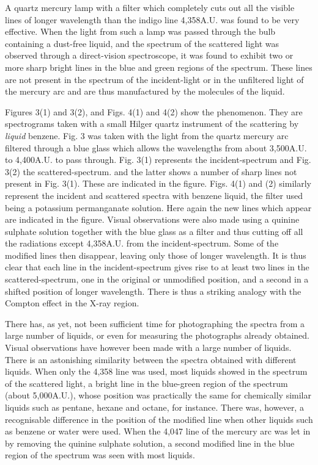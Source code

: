 A quartz mercury lamp with a filter which completely cuts out all the visible lines of longer wavelength than the indigo line \hbox{4,358A.U}. was found to be very effective. When the light from such a lamp was passed through the bulb containing a dust-free liquid, and the spectrum of the scattered light was observed through a direct-vision spectroscope, it was found to exhibit two or more sharp bright lines in the blue and green regions of the spectrum. These lines are not present in the spectrum of the incident-light or in the unfiltered light of the mercury arc and are thus manufactured by the molecules of the liquid.

Figures 3(1) and 3(2), and Figs. 4(1) and 4(2) show the phenomenon. They are spectrograms taken with a small Hilger quartz instrument of the scattering by {\em liquid} benzene. Fig. 3 was taken with the light from the quartz mercury arc filtered through a blue glass which allows the wavelengths from about 3,500A.U. to 4,400A.U. to pass through. Fig. 3(1) represents the incident-spectrum and Fig. 3(2) the scattered-spectrum. and the latter shows a number of sharp lines not present in Fig. 3(1). These are indicated in the figure. Figs. 4(1) and (2) similarly represent the incident and scattered spectra with benzene liquid, the filter used being a potassium permanganate solution. Here again the new lines which appear are indicated in the figure. Visual observations were also made using a quinine sulphate solution together with the blue glass as a filter and thus cutting off all the radiations except 4,358A.U. from the incident-spectrum. Some of the modified lines then disappear, leaving only those of longer wavelength. It is thus clear that each line in the incident-spectrum gives rise to at least two lines in the scattered-spectrum, one in the original or unmodified position, and a second in a shifted position of longer wavelength. There is thus a striking analogy with the Compton effect in the X-ray region.

There has, as yet, not been sufficient time for photographing the spectra from a large number of liquids, or even for measuring the photographs already obtained. Visual observations have however been made with a large number of liquids. There is an astonishing similarity between the spectra obtained with different liquids. When only the 4,358 line was used, most liquids showed in the spectrum of the scattered light, a bright line in the blue-green region of the spectrum (about 5,000A.U.), whose position was practically the same for chemically similar liquids such as pentane, hexane and octane, for instance. There was, however, a recognisable difference in the position of the modified line when other liquids such as benzene or water were used. When the 4,047 line of the mercury arc was let in by removing the quinine sulphate solution, a second modified line in the blue region of the spectrum was seen with most liquids.

